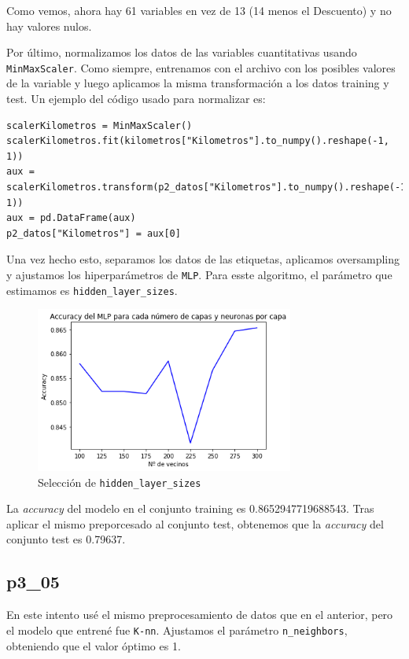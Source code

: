 \documentclass[a4]{article}
\begin{document}
Como vemos, ahora hay 61 variables en vez de 13 (14 menos el Descuento) y no hay valores nulos.

Por último, normalizamos los datos de las variables cuantitativas usando \texttt{MinMaxScaler}. Como siempre, entrenamos con el archivo con los posibles valores de la variable y luego aplicamos la misma transformación a los datos training y test. Un  ejemplo del código usado para normalizar es:

\begin{lstlisting}
scalerKilometros = MinMaxScaler()
scalerKilometros.fit(kilometros["Kilometros"].to_numpy().reshape(-1, 1))
aux = scalerKilometros.transform(p2_datos["Kilometros"].to_numpy().reshape(-1, 1))
aux = pd.DataFrame(aux)
p2_datos["Kilometros"] = aux[0]
\end{lstlisting}

Una vez hecho esto, separamos los datos de las etiquetas, aplicamos oversampling y ajustamos los hiperparámetros de \texttt{MLP}. Para esste algoritmo, el parámetro que estimamos es \texttt{hidden\_layer\_sizes}.

\begin{figure}[H]
  \centering
  \caption{Selección de \texttt{hidden\_layer\_sizes}}
  \includegraphics[width=85mm]{imagenes/p3_04_layers}
\end{figure}

La \textit{accuracy} del modelo en el conjunto training es 0.8652947719688543. Tras aplicar el mismo preporcesado al conjunto test, obtenemos que la \textit{accuracy} del conjunto test es 0.79637.

\subsection{p3\_05}

En este intento usé el mismo preprocesamiento de datos que en el anterior, pero el modelo que entrené fue \texttt{K-nn}. Ajustamos el parámetro \texttt{n\_neighbors}, obteniendo que el valor óptimo es 1.
\end{document}
